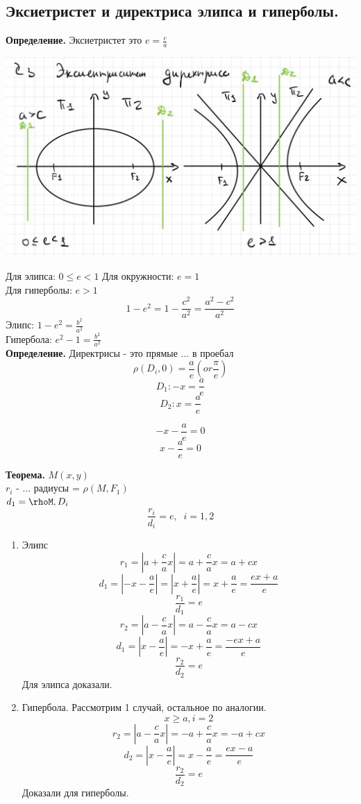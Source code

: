 \documentclass[12pt, paper]{article}
\begin{document}
\subsection{Эксиетристет и директриса элипса и гиперболы.}
\textbf{Определение.} Эксиетристет это $e = \frac{c}{a}$\\
\begin{center}
	\includegraphics[width=0.5\linewidth]{images/Прямые 2 порядка/Директриса и екс/Директриса и екс.jpg}
\end{center}

Для элипса: $ 0 \leq e < 1$
Для окружности: $e=1$\\
Для гиперболы: $e > 1$
\[ 1 - e^2 = 1- \frac{c^2}{a^2} = \frac{a^2-c^2}{a^2} \]
Элипс: $1-e^2 = \frac{b^2}{a^2}$\\
Гипербола: $ e^2 - 1 = \frac{b^2}{a^2} $\\
\textbf{Определение.} Директрисы - это прямые ... в проебал
\[ \rho(D_i, 0) = \frac{a}{e} (or \frac{\pi}{e})  \]
\[D_1: -x=\frac{a}{e} \]
\[D_2: x=\frac{a}{e} \]
\begin{tcolorbox}
	\[-x - \frac{a}{e} = 0 \]
	\[x - \frac{a}{e} = 0 \]
\end{tcolorbox}
\textbf{Теорема. } $M(x, y)$\\
$r_i$ - ... радиусы = $\rho(M, F_1)$\\
$d_1 = \rhoM, D_i$
\[ \frac{r_i}{d_i} = e,\;\; i =1, 2 \]
\begin{tcolorbox}[title=Доказательство]
	\begin{enumerate}
		\item Элипс
		\[ r_1 = |a+\frac{c}{a}x| = a+\frac{c}{a}x = a + cx \]
		\[ d_1 = |-x -\frac{a}{e}| =  |x + \frac{a}{e}| = x+ \frac{a}{e} = \frac{ex+a}{e} \]
		\[ \frac{r_1}{d_1} = e \]
		\[ r_2 = |a-\frac{c}{a}x| = a-\frac{c}{a}x = a - cx \]
		\[ d_1 = |x -\frac{a}{e}| = -x + \frac{a}{e} = \frac{-ex+a}{e} \]
		\[ \frac{r_2}{d_2} = e \]
		Для элипса доказали. 
	\item Гипербола. Рассмотрим 1 случай, остальное по аналогии.\\
		\[ x \geq a, i=2 \]
		\[ r_2 = |a - \frac{c}{a}x| = -a + \frac{c}{a}x = -a + cx \]
		\[ d_2 = |x - \frac{a}{e}| = x - \frac{a}{e} = \frac{ex -a}{e} \]
		\[ \frac{r_2}{d_2} = e \]
		Доказали для гиперболы.
	\end{enumerate}
\end{tcolorbox}
\end{document}
